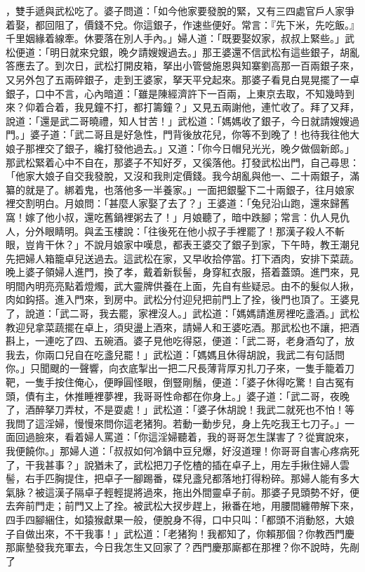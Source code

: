 ，雙手遞與武松吃了。婆子問道：「如今他家要發脫的緊，又有三四處官戶人家爭着娶，都回阻了，價錢不兌。你這銀子，作速些便好。常言：『先下米，先吃飯。』千里姻緣着線牽。休要落在別人手內。」婦人道：「既要娶奴家，叔叔上緊些。」武松便道：「明日就來兌銀，晚夕請嫂嫂過去。」那王婆還不信武松有這些銀子，胡亂答應去了。到次日，武松打開皮箱，拏出小管營施恩與知寨劉高那一百兩銀子來，又另外包了五兩碎銀子，走到王婆家，拏天平兌起來。那婆子看見白晃晃擺了一卓銀子，口中不言，心內暗道：「雖是陳經濟許下一百兩，上東京去取，不知幾時到來？仰着合着，我見鐘不打，都打籌鐘？」又見五兩謝他，連忙收了。拜了又拜，說道：「還是武二哥曉禮，知人甘苦！」武松道：「媽媽收了銀子，今日就請嫂嫂過門。」婆子道：「武二哥且是好急性，門背後放花兒，你等不到晚了！也待我往他大娘子那裡交了銀子，纔打發他過去。」又道：「你今日帽兒光光，晚夕做個新郎。」那武松緊着心中不自在，那婆子不知好歹，又徯落他。打發武松出門，自己尋思：「他家大娘子自交我發脫，又沒和我則定價錢。我今胡亂與他一、二十兩銀子，滿纂的就是了。綁着鬼，也落他多一半養家。」一面把銀鑿下二十兩銀子，往月娘家裡交割明白。月娘問：「甚麼人家娶了去了？」王婆道：「兔兒沿山跑，還來歸舊窩！嫁了他小叔，還吃舊鍋裡粥去了！」月娘聽了，暗中跌腳；常言：仇人見仇人，分外眼睛明。與孟玉樓說：「往後死在他小叔子手裡罷了！那漢子殺人不斬眼，豈肯干休？」不說月娘家中嘆息，都表王婆交了銀子到家，下午時，教王潮兒先把婦人箱籠卓兒送過去。這武松在家，又早收拾停當。打下酒肉，安排下菜蔬。晚上婆子領婦人進門，換了孝，戴着新䯼髻，身穿紅衣服，搭着蓋頭。進門來，見明間內明亮亮點着燈燭，武大靈牌供養在上面，先自有些疑忌。由不的髮似人揪，肉如鈎搭。進入門來，到房中。武松分付迎兒把前門上了拴，後門也頂了。王婆見了，說道：「武二哥，我去罷，家裡沒人。」武松道：「媽媽請進房裡吃盞酒。」武松教迎兒拿菜蔬擺在卓上，須臾盪上酒來，請婦人和王婆吃酒。那武松也不讓，把酒斟上，一連吃了四、五碗酒。婆子見他吃得惡，便道：「武二哥，老身酒勾了，放我去，你兩口兒自在吃盞兒罷！」武松道：「媽媽且休得胡說，我武二有句話問你。」只聞颼的一聲響，向衣底掣出一把二尺長薄背厚刃扎刀子來，一隻手籠着刀靶，一隻手按住俺心，便睜圓怪眼，倒豎剛鬚，便道：「婆子休得吃驚！自古冤有頭，債有主，休推睡裡夢裡，我哥哥性命都在你身上。」婆子道：「武二哥，夜晚了，酒醉拏刀弄杖，不是耍處！」武松道：「婆子休胡說！我武二就死也不怕！等我問了這淫婦，慢慢來問你這老猪狗。若動一動步兒，身上先吃我王七刀子。」一面回過臉來，看着婦人罵道：「你這淫婦聽着，我的哥哥怎生謀害了？從實說來，我便饒你。」那婦人道：「叔叔如何冷鍋中豆兒爆，好沒道理！你哥哥自害心疼病死了，干我甚事？」說猶未了，武松把刀子忔楂的插在卓子上，用左手揪住婦人雲髻，右手匹胸提住，把卓子一腳踢番，碟兒盞兒都落地打得粉碎。那婦人能有多大氣脉？被這漢子隔卓子輕輕提將過來，拖出外間靈卓子前。那婆子見頭勢不好，便去奔前門走；前門又上了拴。被武松大扠步趕上，揪番在地，用腰間纏帶解下來，四手四腳綑住，如猿猴獻果一般，便脫身不得，口中只叫：「都頭不消動怒，大娘子自做出來，不干我事！」武松道：「老猪狗！我都知了，你賴那個？你教西門慶那廝墊發我充軍去，今日我怎生又回家了？西門慶那廝都在那裡？你不說時，先剮了